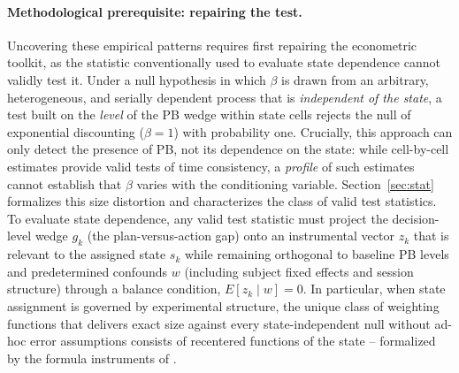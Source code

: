 \documentclass[11pt,a4paper]{article}
\theoremstyle{plain}
\theoremstyle{definition}
\begin{document}
\paragraph{Methodological prerequisite: repairing the test.} Uncovering these empirical patterns requires first repairing the econometric toolkit, as the statistic conventionally used to evaluate state dependence cannot validly test it.
Under a null hypothesis in which $\beta$ is drawn from an arbitrary, heterogeneous, and serially dependent process that is \emph{independent of the state}, a test built on the \emph{level} of the PB wedge within state cells rejects the null of exponential discounting ($\beta = 1$) with probability one. Crucially, this approach can only detect the presence of PB, not its dependence on the state: while cell-by-cell estimates provide valid tests of time consistency, a \emph{profile} of such estimates cannot establish that $\beta$ varies with the conditioning variable.
Section~\ref{sec:stat} formalizes this size distortion and characterizes the class of valid test statistics. 
To evaluate state dependence, %
any valid test statistic must project the decision-level wedge $g_k$ (the plan-versus-action gap) onto an instrumental vector $z_k$ that is relevant to the assigned state $s_k$ while remaining orthogonal to baseline PB levels and predetermined confounds $w$ (including subject fixed effects and session structure) through a  %
balance condition, $E[z_k \mid w] = 0$.
In particular, when state assignment is governed by experimental structure, the unique class of weighting functions %
that delivers exact size %
against every state-independent null without ad-hoc error assumptions consists of %
recentered functions of the %
state -- formalized by the formula instruments of \citet{borusyak2023,borusyakhull2026}.%
\end{document}
